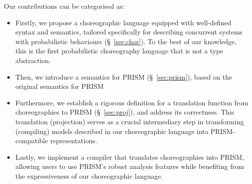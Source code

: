  Our contributions can be
categorised as:
\begin{itemize} 
\item Firstly, we propose a choreographic language equipped with
  well-defined syntax and semantics, tailored specifically for
  describing concurrent systems with probabilistic behaviours
  (\S~\ref{sec:chor}). To the best of our knowledge, this is the first
  probabilistic choreography language that is not a type abstraction.
\item Then, we introduce a semantics for PRISM (\S~\ref{sec:prism}),
  based on the original semantics for PRISM~\cite{PRISMdoc}
\item Furthermore, we establish a rigorous definition for a
  translation function from choreographies to PRISM
  (\S~\ref{sec:proj}), and address its correctness. This translation
  (projection) serves as a crucial intermediary step in transforming
  (compiling) models described in our choreographic language into
  PRISM-compatible representations.
\item Lastly, we implement a compiler that translates choreographies
  into PRISM, allowing users to use PRISM's robust analysis features
  while benefiting from the expressiveness of our choreographic
  language.
\end{itemize}



